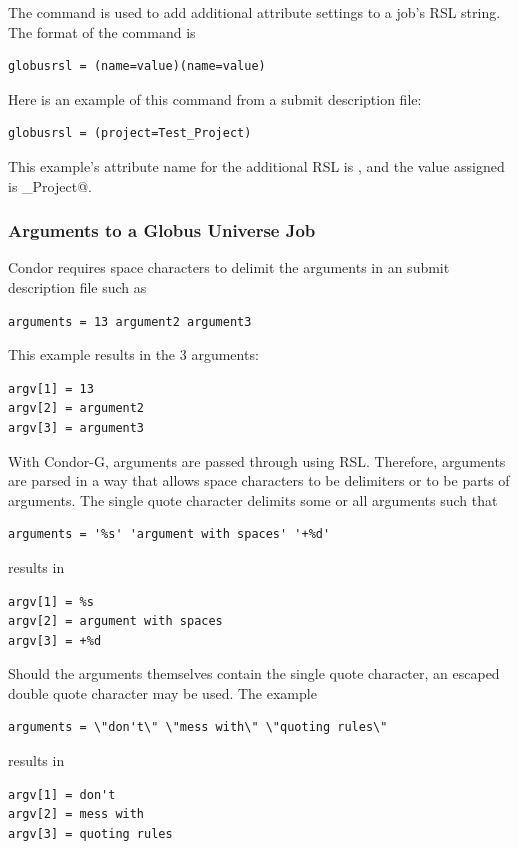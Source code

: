 The  command is used to add additional
attribute settings to a job's RSL string.
The format of the  command is
\begin{verbatim}
globusrsl = (name=value)(name=value)
\end{verbatim}
Here is an example of this command from a submit description file:
\begin{verbatim}
globusrsl = (project=Test_Project)
\end{verbatim}
This example's attribute name for the additional RSL is
\verb@project@, and the value assigned is \verb@Test_Project@.

\subsubsection{\label{sec:CondorG-Submit-Args}Arguments to a Globus Universe Job}

Condor requires space characters to delimit the arguments
in an submit description file such as
\begin{verbatim}
arguments = 13 argument2 argument3
\end{verbatim}
This example results in the 3 arguments:
\begin{verbatim}
argv[1] = 13
argv[2] = argument2
argv[3] = argument3
\end{verbatim}

With Condor-G, arguments are passed through using RSL.
Therefore, arguments are parsed in a way that allows space characters
to be delimiters or to be parts of arguments.
The single quote character delimits some or all arguments such that
\begin{verbatim}
arguments = '%s' 'argument with spaces' '+%d'
\end{verbatim}
results in
\begin{verbatim}
argv[1] = %s
argv[2] = argument with spaces
argv[3] = +%d
\end{verbatim}

Should the arguments themselves contain the single quote character,
an escaped double quote character may be used.
The example
\footnotesize
\begin{verbatim}
arguments = \"don't\" \"mess with\" \"quoting rules\"
\end{verbatim}
\normalsize
results in 
\begin{verbatim}
argv[1] = don't
argv[2] = mess with
argv[3] = quoting rules
\end{verbatim}

